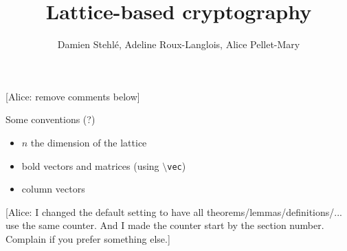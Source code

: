 \documentclass[a4paper,11pt]{article}
\title{Lattice-based cryptography}
\author{Damien Stehlé, Adeline Roux-Langlois, Alice Pellet-Mary}
\theoremstyle{definition}
\begin{document}
\maketitle

{\color{red} [Alice: remove comments below]}

Some conventions (?)
\begin{itemize}
\item $n$ the dimension of the lattice
\item bold vectors and matrices (using \texttt{$\setminus$vec})
\item column vectors
\end{itemize}

{\color{red} [Alice: I changed the default setting to have all theorems/lemmas/definitions/... use the same counter. And I made the counter start by the section number. Complain if you prefer something else.]}

\tableofcontents








\end{document}
